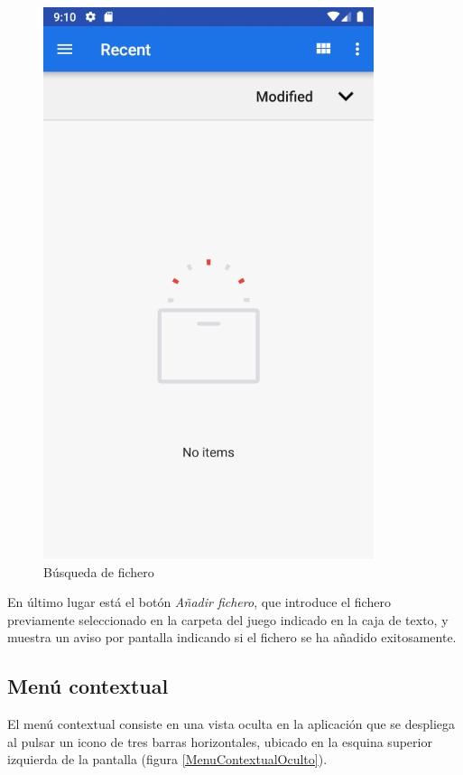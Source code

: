 \begin{figure}[H]
    \centering
    \includegraphics[scale=0.7]{Figures/Capturas/SistemaFicheros.png}
    \caption{Búsqueda de fichero}
    \label{SeleccionarFichero1}    
\end{figure}

En último lugar está el botón \textit{Añadir fichero}, que introduce el fichero previamente 
seleccionado en la carpeta del juego indicado en la caja de texto, y muestra un aviso por pantalla indicando si 
el fichero se ha añadido exitosamente.

\subsection{Menú contextual}
El menú contextual consiste en una vista oculta en la aplicación que se despliega al pulsar un icono de 
tres barras horizontales, ubicado en la esquina superior izquierda de la pantalla (figura \ref*{MenuContextualOculto}).

